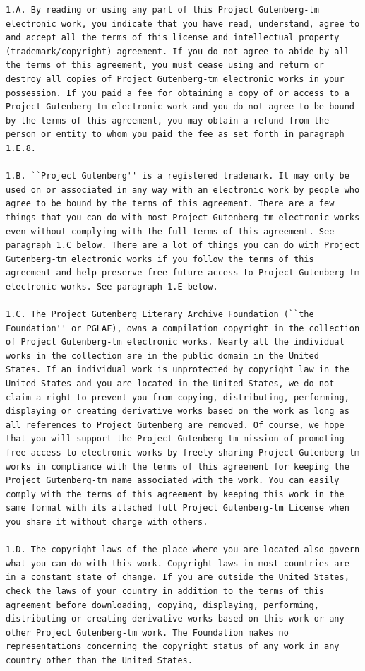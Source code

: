 \documentclass[11pt,oneside]{book}
\begin{document}
\begin{verbatim}
1.A. By reading or using any part of this Project Gutenberg-tm
electronic work, you indicate that you have read, understand, agree to
and accept all the terms of this license and intellectual property
(trademark/copyright) agreement. If you do not agree to abide by all
the terms of this agreement, you must cease using and return or
destroy all copies of Project Gutenberg-tm electronic works in your
possession. If you paid a fee for obtaining a copy of or access to a
Project Gutenberg-tm electronic work and you do not agree to be bound
by the terms of this agreement, you may obtain a refund from the
person or entity to whom you paid the fee as set forth in paragraph
1.E.8.

1.B. ``Project Gutenberg'' is a registered trademark. It may only be
used on or associated in any way with an electronic work by people who
agree to be bound by the terms of this agreement. There are a few
things that you can do with most Project Gutenberg-tm electronic works
even without complying with the full terms of this agreement. See
paragraph 1.C below. There are a lot of things you can do with Project
Gutenberg-tm electronic works if you follow the terms of this
agreement and help preserve free future access to Project Gutenberg-tm
electronic works. See paragraph 1.E below.

1.C. The Project Gutenberg Literary Archive Foundation (``the
Foundation'' or PGLAF), owns a compilation copyright in the collection
of Project Gutenberg-tm electronic works. Nearly all the individual
works in the collection are in the public domain in the United
States. If an individual work is unprotected by copyright law in the
United States and you are located in the United States, we do not
claim a right to prevent you from copying, distributing, performing,
displaying or creating derivative works based on the work as long as
all references to Project Gutenberg are removed. Of course, we hope
that you will support the Project Gutenberg-tm mission of promoting
free access to electronic works by freely sharing Project Gutenberg-tm
works in compliance with the terms of this agreement for keeping the
Project Gutenberg-tm name associated with the work. You can easily
comply with the terms of this agreement by keeping this work in the
same format with its attached full Project Gutenberg-tm License when
you share it without charge with others.

1.D. The copyright laws of the place where you are located also govern
what you can do with this work. Copyright laws in most countries are
in a constant state of change. If you are outside the United States,
check the laws of your country in addition to the terms of this
agreement before downloading, copying, displaying, performing,
distributing or creating derivative works based on this work or any
other Project Gutenberg-tm work. The Foundation makes no
representations concerning the copyright status of any work in any
country other than the United States.


\end{verbatim}
\end{document}
